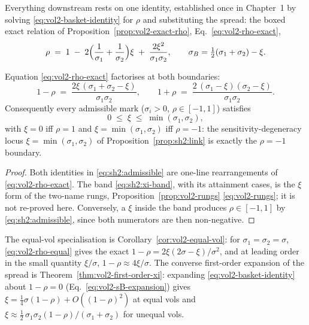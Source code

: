 Everything downstream rests on one identity, established once in
Chapter~1 by solving \eqref{eq:vol2-basket-identity} for $\rho$ and
substituting the spread: the boxed exact relation of
Proposition~\ref{prop:vol2-exact-rho}, Eq.~\eqref{eq:vol2-rho-exact},
\[
  \rho \;=\; 1
  \;-\; 2\Bigl(\frac{1}{\sigma_1} + \frac{1}{\sigma_2}\Bigr)\xi
  \;+\; \frac{2 \xi^2}{\sigma_1 \sigma_2},
  \qquad \sigma_B = \tfrac12(\sigma_1 + \sigma_2) - \xi .
\]

\begin{corollary}\label{cor:sh2:admissible}
Equation \eqref{eq:vol2-rho-exact} factorises at both boundaries:
\begin{equation}\label{eq:sh2:admissible}
  1 - \rho \;=\; \frac{2\xi\,(\sigma_1 + \sigma_2 - \xi)}{\sigma_1 \sigma_2},
  \qquad
  1 + \rho \;=\; \frac{2\,(\sigma_1 - \xi)(\sigma_2 - \xi)}{\sigma_1 \sigma_2}.
\end{equation}
Consequently every admissible mark ($\sigma_i > 0$, $\rho \in [-1, 1]$)
satisfies
\begin{equation}\label{eq:sh2:xi-band}
  0 \;\le\; \xi \;\le\; \min(\sigma_1, \sigma_2),
\end{equation}
with $\xi = 0$ iff $\rho = 1$ and $\xi = \min(\sigma_1, \sigma_2)$ iff
$\rho = -1$: the sensitivity-degeneracy locus $\xi = \min(\sigma_1,
\sigma_2)$ of Proposition~\ref{prop:sh2:link} is exactly the $\rho = -1$
boundary.
\end{corollary}

\begin{proof}
Both identities in \eqref{eq:sh2:admissible} are one-line rearrangements
of \eqref{eq:vol2-rho-exact}. The band \eqref{eq:sh2:xi-band}, with its
attainment cases, is the $\xi$ form of the two-name rungs,
Proposition~\ref{prop:vol2-rungs} \eqref{eq:vol2-rungs}; it is not
re-proved here. Conversely, a $\xi$ inside the band produces
$\rho \in [-1, 1]$ by \eqref{eq:sh2:admissible}, since both numerators are
then non-negative.
\end{proof}

The equal-vol specialisation is Corollary~\ref{cor:vol2-equal-vol}: for
$\sigma_1 = \sigma_2 = \sigma$, \eqref{eq:vol2-rho-equal} gives the exact
$1 - \rho = 2\xi(2\sigma - \xi)/\sigma^2$, and at leading order in the
small quantity $\xi/\sigma$, $1 - \rho \approx 4\xi/\sigma$. The converse
first-order expansion of the spread is
Theorem~\ref{thm:vol2-first-order-xi}: expanding
\eqref{eq:vol2-basket-identity} about $1 - \rho = 0$
(Eq.~\eqref{eq:vol2-sB-expansion}) gives
$\xi = \tfrac14 \sigma (1 - \rho) + O((1 - \rho)^2)$ at equal vols and
$\xi \approx \tfrac12\, \sigma_1 \sigma_2 (1 - \rho)/(\sigma_1 + \sigma_2)$
for unequal vols.

